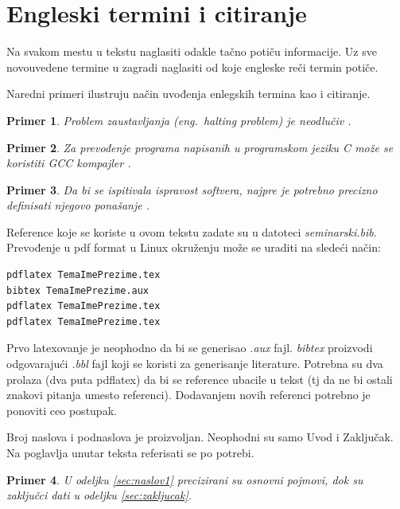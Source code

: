 \documentclass[a4paper]{article}
\newtheorem{primer}{Primer}[section]
\begin{document}
\section{Engleski termini i citiranje}	
\label{sec:termini_i_citiranje}

Na svakom mestu u tekstu naglasiti odakle tačno potiču informacije. Uz sve novouvedene termine u zagradi naglasiti od koje engleske reči termin potiče. 

Naredni primeri ilustruju način uvođenja enlegskih termina kao i citiranje.

\begin{primer}
Problem zaustavljanja (eng.~{\em halting problem}) je neodlučiv \cite{haltingproblem}.
\end{primer}

\begin{primer}
Za prevođenje programa napisanih u programskom jeziku C može se koristiti GCC kompajler \cite{gcc}.
\end{primer}

\begin{primer}
 Da bi se ispitivala ispravost softvera, najpre je potrebno precizno definisati njegovo ponašanje \cite{laski2009software}. 
\end{primer}

Reference koje se koriste u ovom tekstu zadate su u datoteci {\em seminarski.bib}. Prevođenje u pdf format u Linux okruženju može se uraditi na sledeći način:
\begin{verbatim}
pdflatex TemaImePrezime.tex 
bibtex TemaImePrezime.aux 
pdflatex TemaImePrezime.tex 
pdflatex TemaImePrezime.tex 
\end{verbatim}
Prvo latexovanje je neophodno da bi se generisao {\em .aux} fajl. {\em bibtex} proizvodi odgovarajući {\em .bbl} fajl koji se koristi za generisanje literature. 
Potrebna su dva prolaza (dva puta pdflatex) da bi se reference ubacile u tekst (tj da ne bi ostali znakovi pitanja umesto referenci). Dodavanjem novih referenci potrebno je ponoviti ceo postupak.  











Broj naslova i podnaslova je proizvoljan. Neophodni su samo Uvod i Zaključak. Na poglavlja unutar teksta referisati se po potrebi. 
\begin{primer}
U odeljku \ref{sec:naslov1} precizirani su osnovni pojmovi, dok su zaključci dati u odeljku \ref{sec:zakljucak}.
\end{primer}
\end{document}
